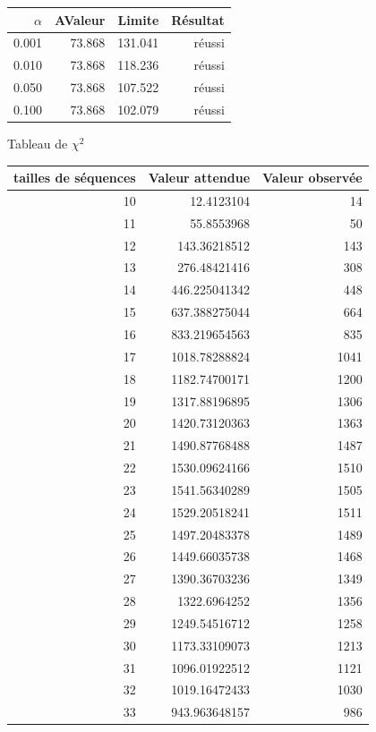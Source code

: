 \documentclass[10pt,a4paper]{article}
\begin{document}
\begin{figure}[h]
\centering
\begin{tabular}{|r|r|r|r|}
\hline
$\alpha$ & AValeur & Limite & Résultat\\
\hline
0.001 & 73.868 & 131.041 & réussi\\
0.010 & 73.868 & 118.236 & réussi\\
0.050 & 73.868 & 107.522 & réussi\\
0.100 & 73.868 & 102.079 & réussi\\
\hline
\end{tabular}
\caption{Tableau de $\chi^2$}
\end{figure}

\newpage

\begin{figure}[h]
\centering
\begin{tabular}{|r|r|r|}
\hline
tailles de séquences & Valeur attendue & Valeur observée\\
\hline
10 & 12.4123104 & 14\\
11 & 55.8553968 & 50\\
12 & 143.36218512 & 143\\
13 & 276.48421416 & 308\\
14 & 446.225041342 & 448\\
15 & 637.388275044 & 664\\
16 & 833.219654563 & 835\\
17 & 1018.78288824 & 1041\\
18 & 1182.74700171 & 1200\\
19 & 1317.88196895 & 1306\\
20 & 1420.73120363 & 1363\\
21 & 1490.87768488 & 1487\\
22 & 1530.09624166 & 1510\\
23 & 1541.56340289 & 1505\\
24 & 1529.20518241 & 1511\\
25 & 1497.20483378 & 1489\\
26 & 1449.66035738 & 1468\\
27 & 1390.36703236 & 1349\\
28 & 1322.6964252 & 1356\\
29 & 1249.54516712 & 1258\\
30 & 1173.33109073 & 1213\\
31 & 1096.01922512 & 1121\\
32 & 1019.16472433 & 1030\\
33 & 943.963648157 & 986\\

\end{tabular}
\end{figure}
\end{document}
